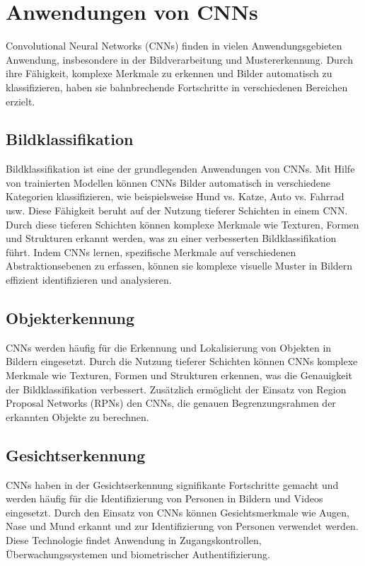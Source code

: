 \section{Anwendungen von CNNs}

	Convolutional Neural Networks (CNNs) finden in vielen Anwendungsgebieten Anwendung, insbesondere in der Bildverarbeitung und Mustererkennung.
	Durch ihre Fähigkeit, komplexe Merkmale zu erkennen und Bilder automatisch zu klassifizieren, haben sie bahnbrechende Fortschritte in verschiedenen Bereichen erzielt.

\subsection{Bildklassifikation}

    Bildklassifikation ist eine der grundlegenden Anwendungen von CNNs. 
    Mit Hilfe von trainierten Modellen können CNNs Bilder automatisch in verschiedene Kategorien klassifizieren, wie beispielsweise Hund vs. Katze, Auto vs. Fahrrad usw. Diese Fähigkeit beruht auf der Nutzung tieferer Schichten in einem CNN. 
    Durch diese tieferen Schichten können komplexe Merkmale wie Texturen, Formen und Strukturen erkannt werden, was zu einer verbesserten Bildklassifikation führt. 
    Indem CNNs lernen, spezifische Merkmale auf verschiedenen Abstraktionsebenen zu erfassen, können sie komplexe visuelle Muster in Bildern effizient identifizieren und analysieren.
    
\subsection{Objekterkennung}

	CNNs werden häufig für die Erkennung und Lokalisierung von Objekten in Bildern eingesetzt.
	Durch die Nutzung tieferer Schichten können CNNs komplexe Merkmale wie Texturen, Formen und Strukturen erkennen, was die Genauigkeit der Bildklassifikation verbessert.
	Zusätzlich ermöglicht der Einsatz von Region Proposal Networks (RPNs) den CNNs, die genauen Begrenzungsrahmen der erkannten Objekte zu berechnen.

\subsection{Gesichtserkennung}

	CNNs haben in der Gesichtserkennung signifikante Fortschritte gemacht und werden häufig für die Identifizierung von Personen in Bildern und Videos eingesetzt.
	Durch den Einsatz von CNNs können Gesichtsmerkmale wie Augen, Nase und Mund erkannt und zur Identifizierung von Personen verwendet werden.
	Diese Technologie findet Anwendung in Zugangskontrollen, Überwachungssystemen und biometrischer Authentifizierung.

